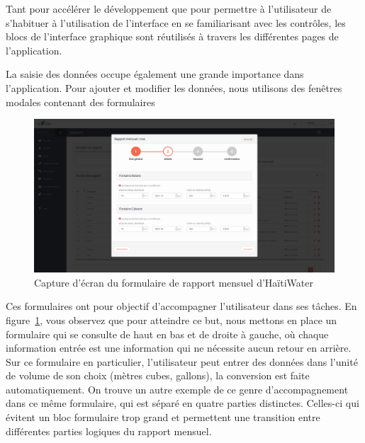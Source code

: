 \documentclass{EPL-master-thesis-covers-FR}
\begin{document}
			Tant pour accélérer le développement que pour permettre à l'utilisateur de s'habituer à l'utilisation de l'interface en se familiarisant avec les contrôles, les blocs de l'interface graphique sont réutilisés à travers les différentes pages de l'application.

			La saisie des données occupe également une grande importance dans l'application. Pour ajouter et modifier les données, nous utilisons des fenêtres modales contenant des formulaires

			\begin{figure}[H]
				\includegraphics[width=\textwidth]{images/screen_rapport_mensuel.png}
				\caption{Capture d'écran du formulaire de rapport mensuel d'HaïtiWater}
				\label{fig:screen_rapport_mensuel}
			\end{figure}

			Ces formulaires ont pour objectif d'accompagner l'utilisateur dans ses tâches. En figure~\ref{fig:screen_rapport_mensuel}, vous observez que pour atteindre ce but, nous mettons en place un formulaire qui se consulte de haut en bas et de droite à gauche, où chaque information entrée est une information qui ne nécessite aucun retour en arrière. Sur ce formulaire en particulier, l'utilisateur peut entrer des données dans l'unité de volume de son choix (mètres cubes, gallons), la conversion est faite automatiquement. On trouve un autre exemple de ce genre d'accompagnement dans ce même formulaire, qui est séparé en quatre parties distinctes. Celles-ci qui évitent un bloc formulaire trop grand et permettent une transition entre différentes parties logiques du rapport mensuel.


\end{document}
